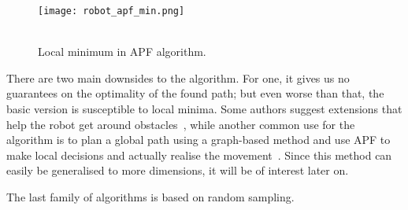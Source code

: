 \begin{wrapfigure}{l}{0.33\textwidth}
    \centering
    \texttt{[image: robot\_apf\_min.png]}
  \caption{\\Local minimum in APF algorithm.}\label{fig:apf_min}
\end{wrapfigure}

There are two main downsides to the algorithm. For one, it gives us no guarantees on the optimality of the found path; but even worse than that, the basic version is susceptible to local minima. Some authors suggest extensions that help the robot get around obstacles~\cite{apf, apf2}, while another common use for the algorithm is to plan a global path using a graph-based method and use APF to make local decisions and actually realise the movement~\cite{hybrid}. Since this method can easily be generalised to more dimensions, it will be of interest later on.

\newpage
The last family of algorithms is based on random sampling.
